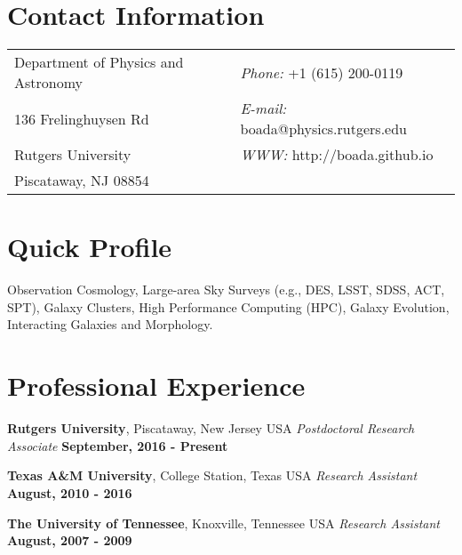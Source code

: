 \documentclass[margin,line, 11pt]{res}
\begin{document}

\begin{resume}
\section{Contact Information}
\vspace{.05in}
\begin{tabular}{@{}p{3in}p{3in}}
Department of Physics and Astronomy & {\it Phone:}  +1 (615) 200-0119 \\            
136 Frelinghuysen Rd   & {\it E-mail:}  boada@physics.rutgers.edu \\         
Rutgers University & {\it WWW:} http://boada.github.io \\       
Piscataway, NJ 08854  & \\     
\end{tabular}

\section{Quick Profile}
Observation Cosmology, Large-area Sky Surveys (e.g., DES, LSST, SDSS, ACT, SPT), Galaxy Clusters, High Performance Computing (HPC), Galaxy Evolution, Interacting Galaxies and Morphology.
\vspace*{-3mm}

\section{Professional Experience}
\textbf{Rutgers University}, Piscataway, New Jersey USA \newline
\textit{Postdoctoral Research Associate} \hfill \textbf{September, 2016 - Present}\newline
\vspace*{-5mm}

\textbf{Texas A\&M University}, College Station, Texas USA\newline
\textit{Research Assistant} \hfill \textbf{August, 2010 - 2016}\newline
\vspace*{-5mm}

\textbf{The University of Tennessee}, Knoxville, Tennessee USA\newline
\textit{Research Assistant} \hfill \textbf{August, 2007 - 2009}\newline
\vspace*{-5mm}


\end{resume}
\end{document}

